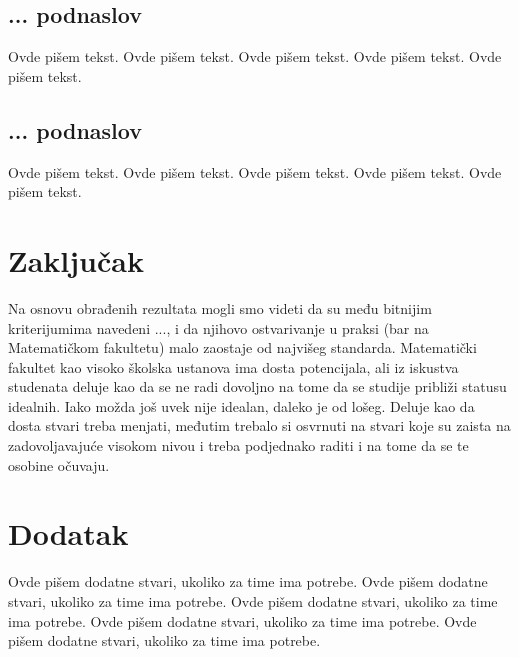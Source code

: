 \documentclass[a4paper]{article}
\begin{document}
\subsection{... podnaslov}
\label{subsec:podnaslovK}

Ovde pišem tekst. 
Ovde pišem tekst. 
Ovde pišem tekst. 
Ovde pišem tekst. 
Ovde pišem tekst. 

\subsection{... podnaslov}
\label{subsec:podnaslovM}

Ovde pišem tekst. 
Ovde pišem tekst. 
Ovde pišem tekst. 
Ovde pišem tekst. 
Ovde pišem tekst. 


\section{Zaključak}
\label{sec:zakljucak}

Na osnovu obrađenih rezultata mogli smo videti da su među bitnijim kriterijumima navedeni ..., i da njihovo ostvarivanje u praksi (bar na Matematičkom fakultetu) malo zaostaje od najvišeg standarda. Matematički fakultet kao visoko školska ustanova ima dosta potencijala, ali iz iskustva studenata deluje kao da se ne radi dovoljno na tome da se studije približi statusu idealnih. Iako možda još uvek nije idealan, daleko je od lošeg. Deluje kao da dosta stvari treba menjati, međutim trebalo si osvrnuti na stvari koje su zaista na zadovoljavajuće visokom nivou i treba podjednako raditi i na tome da se te osobine očuvaju.  



\appendix
 


\appendix
\section{Dodatak}
Ovde pišem dodatne stvari, ukoliko za time ima potrebe.
Ovde pišem dodatne stvari, ukoliko za time ima potrebe.
Ovde pišem dodatne stvari, ukoliko za time ima potrebe.
Ovde pišem dodatne stvari, ukoliko za time ima potrebe.
Ovde pišem dodatne stvari, ukoliko za time ima potrebe.
\end{document}
